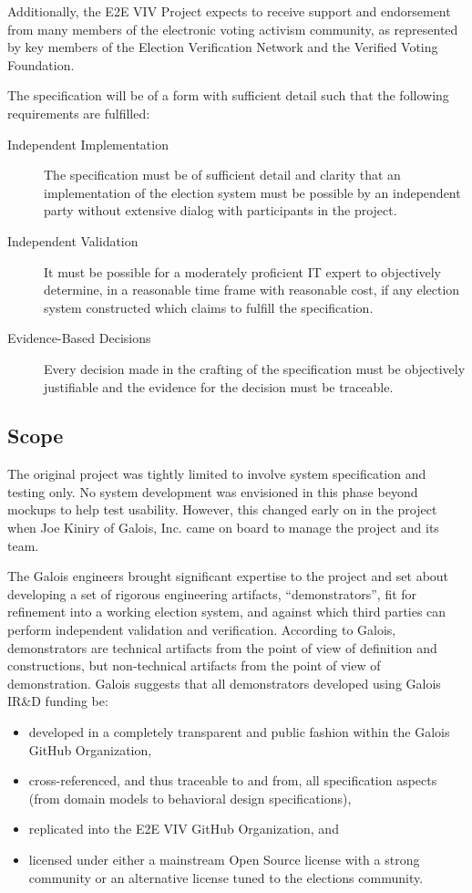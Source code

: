 Additionally, the E2E VIV Project expects to receive support and
endorsement from many members of the electronic voting activism
community, as represented by key members of the Election Verification
Network and the Verified Voting Foundation.

The specification will be of a form with sufficient detail such that
the following requirements are fulfilled:
\begin{description}
\item[Independent Implementation] The specification must be of
  sufficient detail and clarity that an implementation of the election
  system must be possible by an independent party without extensive
  dialog with participants in the project.
\item[Independent Validation] It must be possible for a moderately
  proficient IT expert to objectively determine, in a reasonable time
  frame with reasonable cost, if any election system constructed which
  claims to fulfill the specification.
\item[Evidence-Based Decisions] Every decision made in the crafting of
  the specification must be objectively justifiable and the evidence
  for the decision must be traceable.
\end{description}

\subsection{Scope}
\label{sec:scope}

The original project was tightly limited to involve system
specification and testing only. No system development was envisioned
in this phase beyond mockups to help test usability. However, this
changed early on in the project when Joe Kiniry of Galois, Inc. came
on board to manage the project and its team.

The Galois engineers brought significant expertise to the project and
set about developing a set of rigorous engineering artifacts,
``demonstrators'', fit for refinement into a working election system,
and against which third parties can perform independent validation and
verification. According to Galois, demonstrators are technical
artifacts from the point of view of definition and constructions, but
non-technical artifacts from the point of view of
demonstration. Galois suggests that all demonstrators developed using
Galois IR\&D funding be:
\begin{itemize}
\item developed in a completely transparent and public fashion within
  the Galois GitHub Organization,
\item cross-referenced, and thus traceable to and from, all
  specification aspects (from domain models to behavioral design
  specifications),
\item replicated into the E2E VIV GitHub Organization, and
\item licensed under either a mainstream Open Source license with a
  strong community or an alternative license tuned to the elections
  community.
\end{itemize}

